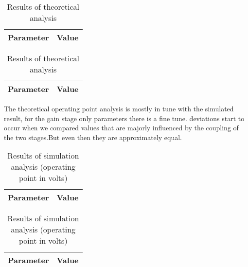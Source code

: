 \begin{table}[!htb]
  \begin{minipage}{.5\linewidth}
     \centering
  \begin{tabular}{|c|c|}
    \hline    
    {\bf Parameter} & {\bf Value} \\ \hline
    
 \end{tabular}
 \caption{Results of simulation analysis}
 \label{tab:merit}
  \end{minipage}%
    \hspace{2 mm}
    \begin{minipage}{.5\linewidth}
      \centering
        \begin{tabular}{|c|c|}
    \hline    
    {\bf Parameter} & {\bf Value} \\ \hline
    
 \end{tabular}
        \caption{Results of theoretical analysis}
        \label{compmerit}
    \end{minipage} 
\end{table}


\newpage

The theoretical operating point analysis is mostly in tune with the simulated result, for the gain stage only parameters there is a fine tune. deviations start to occur when we compared values that are majorly influenced by the coupling of the two stages.But even then they are approximately equal.

\begin{table}[!htb]
  \begin{minipage}{.5\linewidth}
     \centering
  \begin{tabular}{|c|c|}
    \hline    
    {\bf Parameter} & {\bf Value} \\ \hline
    
 \end{tabular}
 \caption{Results of theoretical analysis (operating point in volts)}
 \label{tab:merit}
  \end{minipage}%
    \hspace{2 mm}
    \begin{minipage}{.5\linewidth}
      \centering
        \begin{tabular}{|c|c|}
    \hline    
    {\bf Parameter} & {\bf Value} \\ \hline
    
 \end{tabular}
        \caption{Results of simulation analysis (operating point in volts)}
        \label{compmerit}
    \end{minipage} 
\end{table}
